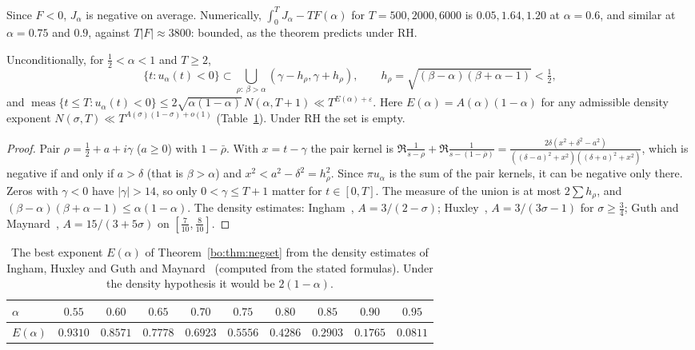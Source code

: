 Since $F<0$, $J_\alpha$ is negative on average. Numerically, $\int_0^TJ_\alpha-TF(\alpha)$ for $T=500,2000,6000$ is $0.05,1.64,1.20$ at $\alpha=0.6$, and similar at $\alpha=0.75$ and $0.9$, against $T|F|\approx3800$: bounded, as the theorem predicts under RH. %

\begin{theorem}\label{bo:thm:negset}
Unconditionally, for $\frac12<\alpha<1$ and $T\ge2$,
\[
\{t:u_\alpha(t)<0\}\subset\bigcup_{\rho:\ \beta>\alpha}(\gamma-h_\rho,\gamma+h_\rho),\qquad h_\rho=\sqrt{(\beta-\alpha)(\beta+\alpha-1)}<\tfrac12,
\]
and $\operatorname{meas}\{t\le T:u_\alpha(t)<0\}\le2\sqrt{\alpha(1-\alpha)}\,N(\alpha,T+1)\ll T^{E(\alpha)+\varepsilon}$. Here $E(\alpha)=A(\alpha)(1-\alpha)$ for any admissible density exponent $N(\sigma,T)\ll T^{A(\sigma)(1-\sigma)+o(1)}$ (Table~\ref{bo:tab:negset}). Under RH the set is empty.
\end{theorem}

\begin{proof}
Pair $\rho=\frac12+a+i\gamma$ ($a\ge0$) with $1-\bar\rho$. With $x=t-\gamma$ the pair kernel is $\Re\frac1{s-\rho}+\Re\frac1{s-(1-\bar\rho)}=\frac{2\delta(x^2+\delta^2-a^2)}{((\delta-a)^2+x^2)((\delta+a)^2+x^2)}$, which is negative if and only if $a>\delta$ (that is $\beta>\alpha$) and $x^2<a^2-\delta^2=h_\rho^2$. Since $\pi u_\alpha$ is the sum of the pair kernels, it can be negative only there. Zeros with $\gamma<0$ have $|\gamma|>14$, so only $0<\gamma\le T+1$ matter for $t\in[0,T]$. The measure of the union is at most $2\sum h_\rho$, and $(\beta-\alpha)(\beta+\alpha-1)\le\alpha(1-\alpha)$. The density estimates: Ingham~\cite{Ingham40}, $A=3/(2-\sigma)$; Huxley~\cite{Huxley72}, $A=3/(3\sigma-1)$ for $\sigma\ge\frac34$; Guth and Maynard~\cite{GM26}, $A=15/(3+5\sigma)$ on $[\frac7{10},\frac8{10}]$.
\end{proof}

\begin{table}[ht]
\centering\small
\begin{tabular}{@{}lccccccccc@{}}
\toprule
$\alpha$ & $0.55$ & $0.60$ & $0.65$ & $0.70$ & $0.75$ & $0.80$ & $0.85$ & $0.90$ & $0.95$\\
\midrule
$E(\alpha)$ & $0.9310$ & $0.8571$ & $0.7778$ & $0.6923$ & $0.5556$ & $0.4286$ & $0.2903$ & $0.1765$ & $0.0811$\\
\bottomrule
\end{tabular}
\caption{The best exponent $E(\alpha)$ of Theorem~\ref{bo:thm:negset} from the density estimates of Ingham, Huxley and Guth and Maynard~\cite{GM26} (computed from the stated formulas). Under the density hypothesis it would be $2(1-\alpha)$.}
\label{bo:tab:negset}
\end{table}

